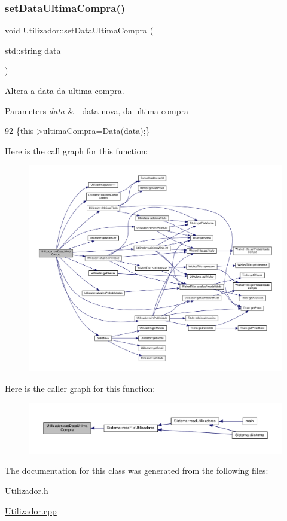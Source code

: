 \subsubsection{\texorpdfstring{set\+Data\+Ultima\+Compra()}{setDataUltimaCompra()}}
{\footnotesize\ttfamily void Utilizador\+::set\+Data\+Ultima\+Compra (\begin{DoxyParamCaption}\item[{std\+::string}]{data }\end{DoxyParamCaption})\hspace{0.3cm}{\ttfamily [inline]}}



Altera a data da ultima compra. 


\begin{DoxyParams}{Parameters}
{\em data} & -\/ data nova, da ultima compra \\
\hline
\end{DoxyParams}

\begin{DoxyCode}
92 \{this->ultimaCompra=\hyperlink{classData}{Data}(data);\}
\end{DoxyCode}
Here is the call graph for this function\+:
\nopagebreak
\begin{figure}[H]
\begin{center}
\leavevmode
\includegraphics[width=350pt]{classUtilizador_ac3c7ff821739e5682a5d06d0868031ac_cgraph}
\end{center}
\end{figure}
Here is the caller graph for this function\+:
\nopagebreak
\begin{figure}[H]
\begin{center}
\leavevmode
\includegraphics[width=350pt]{classUtilizador_ac3c7ff821739e5682a5d06d0868031ac_icgraph}
\end{center}
\end{figure}


The documentation for this class was generated from the following files\+:\begin{DoxyCompactItemize}
\item 
\hyperlink{Utilizador_8h}{Utilizador.\+h}\item 
\hyperlink{Utilizador_8cpp}{Utilizador.\+cpp}\end{DoxyCompactItemize}
